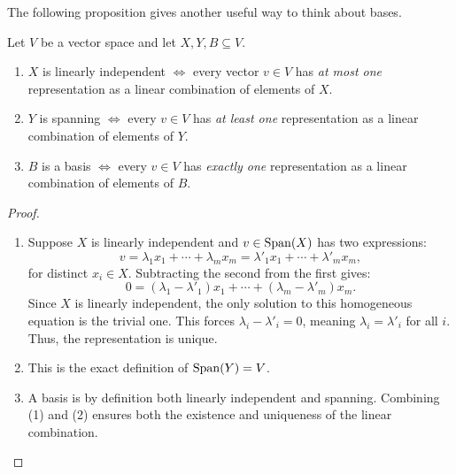 \documentclass[../linear_algebra_and_groups.tex]{subfiles}
\begin{document}
The following proposition gives another useful way to think about bases.
\begin{proposition}
\label{prop:uniquerepbasis}
    \begin{shaded*}
        Let $V$ be a vector space and let $X,Y,B\subseteq V$.
        \begin{enumerate}
            \item $X$ is linearly independent $\iff$ every vector $v\in V$ has \textit{at most one} representation as a linear combination of elements of $X$.
            \item $Y$ is spanning $\iff$ every $v\in V$ has \textit{at least one} representation as a linear combination of elements of $Y$.
            \item $B$ is a basis $\iff$ every $v\in V$ has \textit{exactly one} representation as a linear combination of elements of $B$.
        \end{enumerate}
    \end{shaded*}
\end{proposition}
\begin{proof}
    \begin{enumerate}
        \item[1.] Suppose $X$ is linearly independent and $v\in\operatorname{Span}(X)$ has two expressions:
        \[ v = \lambda_1x_1+\cdots+\lambda_mx_m = \lambda'_1x_1+\cdots+\lambda'_mx_m, \]
        for distinct $x_i \in X$. Subtracting the second from the first gives:
        \[ 0 = (\lambda_1-\lambda'_1)x_1+\cdots+(\lambda_m-\lambda'_m)x_m.\]
        Since $X$ is linearly independent, the only solution to this homogeneous equation is the trivial one. This forces $\lambda_i-\lambda'_i=0$, meaning $\lambda_i=\lambda'_i$ for all $i$. Thus, the representation is unique.
        \item[2.] This is the exact definition of $\operatorname{Span}(Y)=V$.
        \item[3.] A basis is by definition both linearly independent and spanning. Combining (1) and (2) ensures both the existence and uniqueness of the linear combination.\qedhere 
    \end{enumerate}
\end{proof}
\end{document}
